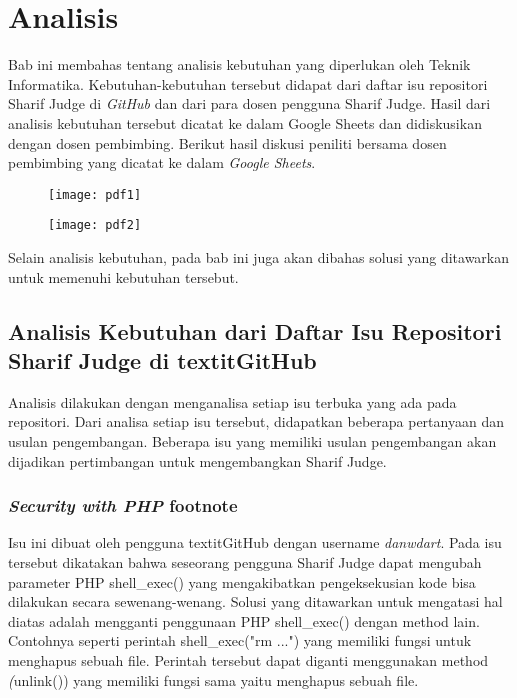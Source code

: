 \chapter{Analisis}
\label{chap:analisis}

Bab ini membahas tentang analisis kebutuhan yang diperlukan oleh Teknik Informatika. Kebutuhan-kebutuhan tersebut didapat dari daftar isu repositori Sharif Judge di \textit{GitHub} dan dari para dosen pengguna Sharif Judge. Hasil dari analisis kebutuhan tersebut dicatat ke dalam Google Sheets dan didiskusikan dengan dosen pembimbing. Berikut hasil diskusi peniliti bersama dosen pembimbing yang dicatat ke dalam \textit{Google Sheets}. 

\begin{figure}[H]
	\centering  
	\texttt{[image: pdf1]}
	
	\texttt{[image: pdf2]}
\end{figure}

Selain analisis kebutuhan, pada bab ini juga akan dibahas solusi yang ditawarkan untuk memenuhi kebutuhan tersebut.

\section{Analisis Kebutuhan dari Daftar Isu Repositori Sharif Judge di textit{GitHub}}
\label{sec:analisisgithub} 
Analisis dilakukan dengan menganalisa setiap isu terbuka yang ada pada repositori. Dari analisa setiap isu tersebut, didapatkan beberapa pertanyaan dan usulan pengembangan. Beberapa isu yang memiliki usulan pengembangan akan dijadikan pertimbangan untuk mengembangkan Sharif Judge.

\subsection{\textit{Security with PHP} footnote}
Isu ini dibuat oleh pengguna textit{GitHub} dengan username \textit{danwdart}. Pada isu tersebut dikatakan bahwa seseorang pengguna Sharif Judge dapat mengubah parameter PHP shell\_exec() yang mengakibatkan pengeksekusian kode bisa dilakukan secara sewenang-wenang. Solusi yang ditawarkan untuk mengatasi hal diatas adalah mengganti penggunaan PHP shell\_exec() dengan method lain. Contohnya seperti perintah shell\_exec("rm ...") yang memiliki fungsi untuk menghapus sebuah file. Perintah tersebut dapat diganti menggunakan method \textit(unlink()) yang memiliki fungsi sama yaitu menghapus sebuah file.
	
